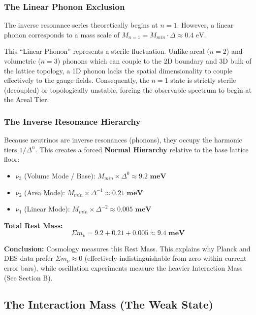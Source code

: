 \subsubsection{The Linear Phonon Exclusion}
The inverse resonance series theoretically begins at $n=1$. However, a linear phonon corresponds to a mass scale of $M_{n=1} = M_{min} \cdot \Delta \approx 0.4 \text{ eV}$. 

This ``Linear Phonon'' represents a sterile fluctuation. Unlike areal ($n=2$) and volumetric ($n=3$) phonons which can couple to the 2D boundary and 3D bulk of the lattice topology, a 1D phonon lacks the spatial dimensionality to couple effectively to the gauge fields. Consequently, the $n=1$ state is strictly sterile (decoupled) or topologically unstable, forcing the observable spectrum to begin at the Areal Tier.

\subsubsection{The Inverse Resonance Hierarchy}
Because neutrinos are inverse resonances (phonons), they occupy the harmonic tiers $1/\Delta^n$. This creates a forced \textbf{Normal Hierarchy} relative to the base lattice floor:

\begin{itemize}
    \item $\nu_3$ (Volume Mode / Base): $M_{min} \times \Delta^0 \approx \mathbf{9.2 \text{ meV}}$
    \item $\nu_2$ (Area Mode): $M_{min} \times \Delta^{-1} \approx \mathbf{0.21 \text{ meV}}$
    \item $\nu_1$ (Linear Mode): $M_{min} \times \Delta^{-2} \approx \mathbf{0.005 \text{ meV}}$
\end{itemize}

\textbf{Total Rest Mass:}
\begin{equation}
    \Sigma m_\nu = 9.2 + 0.21 + 0.005 \approx \mathbf{9.4 \text{ meV}}
\end{equation}

\textbf{Conclusion:} Cosmology measures this Rest Mass. This explains why Planck and DES data prefer $\Sigma m_\nu \approx 0$ (effectively indistinguishable from zero within current error bars), while oscillation experiments measure the heavier Interaction Mass (See Section B).

\subsection{The Interaction Mass (The Weak State)}

